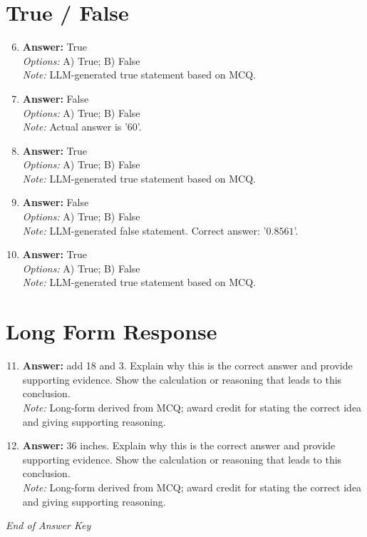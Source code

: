 \documentclass[12pt]{article}
\begin{document}
\section*{True / False}
\begin{enumerate}[label=\arabic*.]
\setcounter{enumi}{5}
\item \textbf{Answer:} True
\\ \textit{Options:} A) True; B) False
\\ \textit{Note:} LLM-generated true statement based on MCQ.
\item \textbf{Answer:} False
\\ \textit{Options:} A) True; B) False
\\ \textit{Note:} Actual answer is '60'.
\item \textbf{Answer:} True
\\ \textit{Options:} A) True; B) False
\\ \textit{Note:} LLM-generated true statement based on MCQ.
\item \textbf{Answer:} False
\\ \textit{Options:} A) True; B) False
\\ \textit{Note:} LLM-generated false statement. Correct answer: '$0.8561$'.
\item \textbf{Answer:} True
\\ \textit{Options:} A) True; B) False
\\ \textit{Note:} LLM-generated true statement based on MCQ.
\end{enumerate}

\section*{Long Form Response}
\begin{enumerate}[label=\arabic*.]
\setcounter{enumi}{10}
\item \textbf{Answer:} add 18 and 3. Explain why this is the correct answer and provide supporting evidence. Show the calculation or reasoning that leads to this conclusion.
\\ \textit{Note:} Long-form derived from MCQ; award credit for stating the correct idea and giving supporting reasoning.
\item \textbf{Answer:} 36 inches. Explain why this is the correct answer and provide supporting evidence. Show the calculation or reasoning that leads to this conclusion.
\\ \textit{Note:} Long-form derived from MCQ; award credit for stating the correct idea and giving supporting reasoning.
\end{enumerate}

\vfill
\noindent\textit{End of Answer Key}
\end{document}

